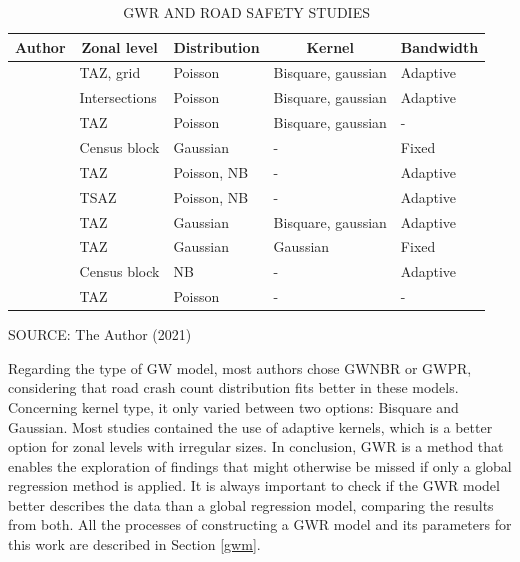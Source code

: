 \begin{table}[!htbp]
    \footnotesize
    \captionsetup{justification=raggedright,
        singlelinecheck=false,
        font=footnotesize}
    \caption{GWR AND ROAD SAFETY STUDIES}
    \centering
    \begin{tabular}{lllp{1.6cm}l}
        \hline
        \multicolumn{1}{c}{\textbf{Author}} & \multicolumn{1}{c}{\textbf{Zonal level}} & \multicolumn{1}{c}{\textbf{Distribution}} & \multicolumn{1}{c}{\textbf{Kernel}} & \multicolumn{1}{c}{\textbf{Bandwidth}} \\
        \hline 
        \textcite{Amoh-Gyimah2017} & TAZ, grid & Poisson & Bisquare, gaussian & Adaptive \\
        \textcite{Arvin2019} & Intersections & Poisson & Bisquare, gaussian & Adaptive \\
        \textcite{Hadayeghi2010} & TAZ & Poisson & Bisquare, gaussian & - \\
        \textcite{Huang2018} & Census block & Gaussian & - & Fixed \\
        \textcite{Obelheiro2019} & TAZ & Poisson, NB & - & Adaptive \\
        \textcite{Obelheiro2020} & TSAZ & Poisson, NB & - & Adaptive \\
        \textcite{Pirdavani2014} & TAZ & Gaussian & Bisquare, gaussian & Adaptive \\
        \textcite{Rhee2016} & TAZ & Gaussian & Gaussian & Fixed \\
        \textcite{Yu2017} & Census block & NB & - & Adaptive \\
        \textcite{Zhang2015} & TAZ & Poisson & - & - \\
        \hline
    \end{tabular}
    \label{tab:gwrworks}
    \par \vspace{2mm} \footnotesize \raggedright
    SOURCE: The Author (2021)
\end{table}

Regarding the type of GW model, most authors chose GWNBR or GWPR, considering that road crash count distribution fits better in these models. Concerning kernel type, it only varied between two options: Bisquare and Gaussian. Most studies contained the use of adaptive kernels, which is a better option for zonal levels with irregular sizes. In conclusion, GWR is a method that enables the exploration of findings that might otherwise be missed if only a global regression method is applied. It is always important to check if the GWR model better describes the data than a global regression model, comparing the results from both. All the processes of constructing a GWR model and its parameters for this work are described in Section \ref{gwm}.

